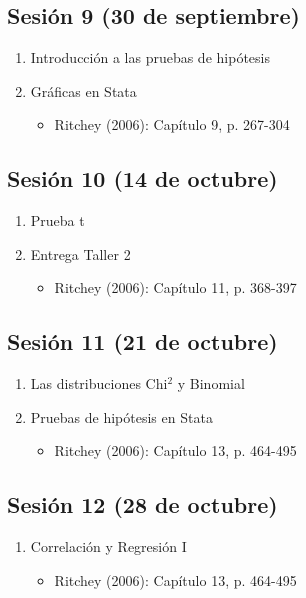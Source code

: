 \documentclass[letterpaper]{article}
\begin{document}
\subsection{Sesión 9 (30 de septiembre)}
\begin{enumerate}
\item Introducción a las pruebas de hipótesis
\item Gráficas en Stata
\begin{itemize}
\item Ritchey (2006): Capítulo 9, p.
267-304
\end{itemize}
\end{enumerate}
\subsection{Sesión 10 (14 de octubre)}

\begin{enumerate}
\item Prueba t
\item Entrega Taller 2
\begin{itemize}
\item Ritchey (2006):
Capítulo 11, p.
368-397
\end{itemize}
\end{enumerate}

\subsection{Sesión 11 (21 de octubre)}
\begin{enumerate}
\item Las distribuciones Chi$^2$ y Binomial
\item Pruebas de hipótesis en Stata
\begin{itemize}
\item Ritchey (2006):
Capítulo 13, p.
464-495
\end{itemize}
\end{enumerate}

\subsection{Sesión 12 (28 de octubre)}
\begin{enumerate}
	\item Correlación y Regresión I
	\begin{itemize}
\item Ritchey (2006):
Capítulo 13, p.
464-495
\end{itemize}
\end{enumerate}
\end{document}
